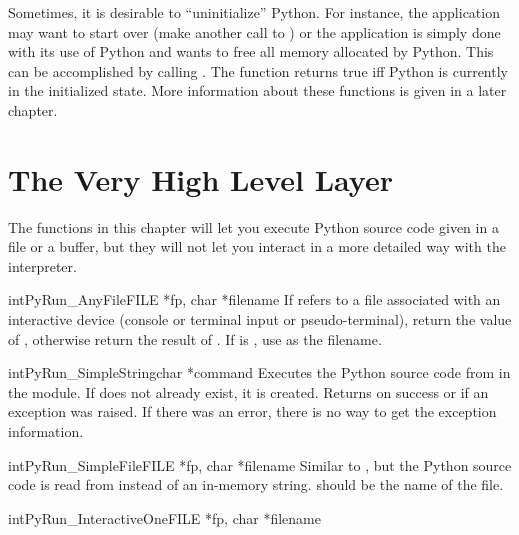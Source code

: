 \documentclass{manual}
\begin{document}
Sometimes, it is desirable to ``uninitialize'' Python.  For instance, 
the application may want to start over (make another call to 
) or the application is simply done with its 
use of Python and wants to free all memory allocated by Python.  This
can be accomplished by calling .  The function
 returns true iff Python is currently in the
initialized state.  More information about these functions is given in
a later chapter.


\chapter{The Very High Level Layer \label{veryhigh}}

The functions in this chapter will let you execute Python source code
given in a file or a buffer, but they will not let you interact in a
more detailed way with the interpreter.

\begin{cfuncdesc}{int}{PyRun_AnyFile}{FILE *fp, char *filename}
  If  refers to a file associated with an interactive device
  (console or terminal input or \UNIX{} pseudo-terminal), return the
  value of , otherwise return the
  result of .  If  is
  \NULL{}, use  as the filename.
\end{cfuncdesc}

\begin{cfuncdesc}{int}{PyRun_SimpleString}{char *command}
  Executes the Python source code from  in the
   module.  If  does not already
  exist, it is created.  Returns  on success or  if
  an exception was raised.  If there was an error, there is no way to
  get the exception information.
\end{cfuncdesc}

\begin{cfuncdesc}{int}{PyRun_SimpleFile}{FILE *fp, char *filename}
  Similar to , but the Python source
  code is read from  instead of an in-memory string.
   should be the name of the file.
\end{cfuncdesc}

\begin{cfuncdesc}{int}{PyRun_InteractiveOne}{FILE *fp, char *filename}
\end{cfuncdesc}
\end{document}
